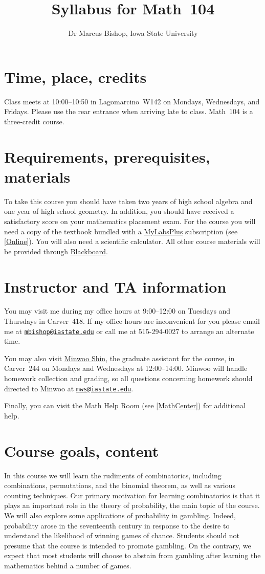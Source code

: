 \documentclass[11pt]{article}
\title{Syllabus for Math~104}
\author{Dr Marcus Bishop, Iowa State University}
\begin{document}
\maketitle

\section{Time, place, credits}\label{Time} Class meets at 10:00--10:50
in Lagomarcino~W142 on Mondays, Wednesdays, and Fridays.
Please use the rear entrance when arriving late to class.
Math~104 is a three-credit course.

\section{Requirements, prerequisites, materials}
To take this course you should have taken two
years of high school algebra and one year of high school geometry.
In addition, you should
have received a satisfactory score on your mathematics placement exam.
For the course you will need a copy of the textbook
bundled with a \href{http://iastate.mylabsplus.com}{MyLabsPlus}
subscription (see \autoref{Online}).
You will also need a scientific calculator.
All other course materials will be provided through
\href{https://bb.its.iastate.edu}{Blackboard}.

\section{Instructor and TA information} You may visit me during my office 
hours at 9:00--12:00 on Tuesdays and Thursdays
in Carver~418. If my office hours are inconvenient for you
please email me at 
\href{mailto:mbishop@iastate.edu}{\tt mbishop@iastate.edu} or call me at 
515-294-0027 to arrange an alternate time.

You may also visit
\href{mailto:mws@iastate.edu}{Minwoo Shin},
the graduate assistant for the course,
in Carver~244 on Mondays and Wednesdays at 12:00--14:00.
Minwoo will handle homework collection and grading, so all questions
concerning homework should directed to Minwoo at
\href{mailto:mws@iastate.edu}{\tt mws@iastate.edu}.

Finally, you can visit the Math Help Room (see \autoref{MathCenter})
for additional help.

\section{Course goals, content}
In this course we will learn the rudiments of combinatorics,
including combinations, permutations, and the binomial theorem,
as well as various counting techniques.
Our primary motivation for learning combinatorics is that it
plays an important role in the theory of probability, the main
topic of the course. We will also explore some
applications of probability in gambling. Indeed, probability
arose in the seventeenth century in response to the desire 
to understand the likelihood of winning games of chance.
Students should not presume that the course is intended to
promote gambling. On the contrary, we expect that most
students will choose to abstain from gambling after learning the mathematics
behind a number of games.
\end{document}
